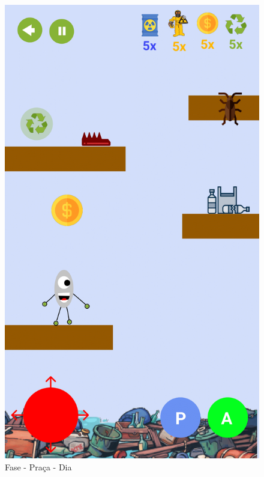 \documentclass[]{scrartcl}
\begin{document}
\begin{figure}[H]
	\begin{center}
		\includegraphics[scale=0.3]{figs/Game Design-07.png}
		\caption{Fase - Praça - Dia}
	\end{center}
\end{figure}
\end{document}
